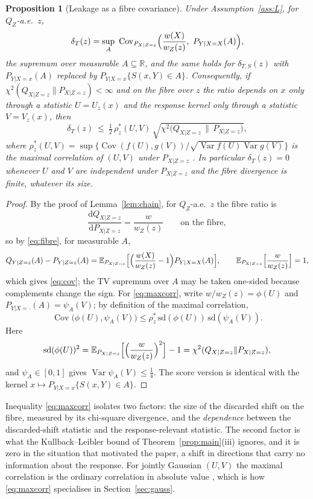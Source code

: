 \documentclass[11pt,a4paper]{article}
\newcommand{\Cov}{\operatorname{Cov}}
\newcommand{\E}{\mathbb{E}}
\newcommand{\R}{\mathbb{R}}
\theoremstyle{plain}
\newtheorem{proposition}[theorem]{Proposition}
\theoremstyle{definition}
\theoremstyle{remark}
\begin{document}
\begin{proposition}[Leakage as a fibre covariance]\label{prop:cov}
Under Assumption~\ref{ass:L}, for $Q_Z$-a.e.\ $z$,
\begin{equation}\label{eq:cov}
\delta_T(z)=\sup_{A}\ \Cov_{P_{X|Z=z}}\Bigl(\frac{w(X)}{w_Z(z)},\ P_{Y|X=X}(A)\Bigr),
\end{equation}
the supremum over measurable $A\subseteq\R$, and the same holds for $\delta_{T,S}(z)$ with $P_{Y|X=x}(A)$ replaced by $P_{Y|X=x}\{S(x,Y)\in A\}$. Consequently, if $\chi^2(Q_{X|Z=z}\|P_{X|Z=z})<\infty$ and on the fibre over $z$ the ratio depends on $x$ only through a statistic $U=U_z(x)$ and the response kernel only through a statistic $V=V_z(x)$, then
\begin{equation}\label{eq:maxcorr}
\delta_T(z)\ \le\ \tfrac12\,\rho^\ast_z(U,V)\,\sqrt{\chi^2\bigl(Q_{X|Z=z}\,\|\,P_{X|Z=z}\bigr)},
\end{equation}
where $\rho^\ast_z(U,V)=\sup\{\Cov(f(U),g(V))/\sqrt{\operatorname{Var}f(U)\operatorname{Var}g(V)}\}$ is the maximal correlation of $(U,V)$ under $P_{X|Z=z}$ \cite{gebelein1941,renyi1959}. In particular $\delta_T(z)=0$ whenever $U$ and $V$ are independent under $P_{X|Z=z}$ and the fibre divergence is finite, whatever its size.
\end{proposition}
\begin{proof}
By the proof of Lemma~\ref{lem:chain}, for $Q_Z$-a.e.\ $z$ the fibre ratio is
\[
\frac{\mathrm dQ_{X|Z=z}}{\mathrm dP_{X|Z=z}}=\frac{w}{w_Z(z)}\qquad\text{on the fibre},
\]
so by \eqref{eq:fibre}, for measurable $A$,
\[
Q_{Y|Z=z}(A)-P_{Y|Z=z}(A)=\E_{P_{X|Z=z}}\Bigl[\Bigl(\frac{w(X)}{w_Z(z)}-1\Bigr)P_{Y|X=X}(A)\Bigr],
\qquad
\E_{P_{X|Z=z}}\Bigl[\frac{w}{w_Z(z)}\Bigr]=1,
\]
which gives \eqref{eq:cov}; the TV supremum over $A$ may be taken one-sided because complements change the sign. For \eqref{eq:maxcorr}, write $w/w_Z(z)=\phi(U)$ and $P_{Y|X=\cdot}(A)=\psi_A(V)$; by definition of the maximal correlation,
\[
\Cov\bigl(\phi(U),\psi_A(V)\bigr)\le\rho^\ast_z\,\mathrm{sd}(\phi(U))\,\mathrm{sd}(\psi_A(V)).
\]
Here
\[
\mathrm{sd}(\phi(U))^2=\E_{P_{X|Z=z}}\Bigl[\Bigl(\frac{w}{w_Z(z)}\Bigr)^2\Bigr]-1=\chi^2(Q_{X|Z=z}\|P_{X|Z=z}),
\]
and $\psi_A\in[0,1]$ gives $\operatorname{Var}\psi_A(V)\le\tfrac14$. The score version is identical with the kernel $x\mapsto P_{Y|X=x}\{S(x,Y)\in A\}$.
\end{proof}

Inequality \eqref{eq:maxcorr} isolates two factors: the size of the discarded shift on the fibre, measured by its chi-square divergence, and the \emph{dependence} between the discarded-shift statistic and the response-relevant statistic. The second factor is what the Kullback--Leibler bound of Theorem~\ref{prop:main}(iii) ignores, and it is zero in the situation that motivated the paper, a shift in directions that carry no information about the response. For jointly Gaussian $(U,V)$ the maximal correlation is the ordinary correlation in absolute value \cite{lancaster1957}, which is how \eqref{eq:maxcorr} specialises in Section~\ref{sec:gauss}.
\end{document}
